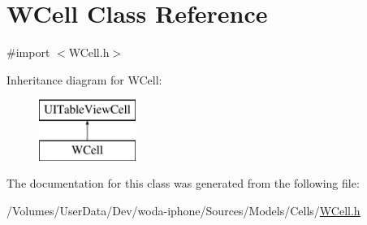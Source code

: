 \hypertarget{interface_w_cell}{\section{W\-Cell Class Reference}
\label{interface_w_cell}
}


{\ttfamily \#import $<$W\-Cell.\-h$>$}

Inheritance diagram for W\-Cell\-:\begin{figure}[H]
\begin{center}
\leavevmode
\includegraphics[height=2.000000cm]{interface_w_cell}
\end{center}
\end{figure}


The documentation for this class was generated from the following file\-:\begin{DoxyCompactItemize}
\item 
/\-Volumes/\-User\-Data/\-Dev/woda-\/iphone/\-Sources/\-Models/\-Cells/\hyperlink{_w_cell_8h}{W\-Cell.\-h}\end{DoxyCompactItemize}
